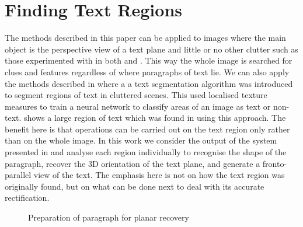 \section{Finding Text Regions}   \label{recoveryusinglines}

The methods described in this paper can be applied to images where the main
object is the perspective view of a text plane and little or no other clutter
such as those experimented with in both \cite{pilucvpr1} and \cite{dance02}.
This way the whole image is searched for clues and features regardless of where
paragraphs of text lie. We can also apply the methods described in
\cite{ClarkICPR2000,clark-ijdar-2001} where a  a text segmentation algorithm was 
introduced to segment regions of text in cluttered scenes. This used 
localised texture measures to train a neural network to classify areas of an
image as text or non-text.  shows a large region of text 
which was found in  using this approach. The benefit here is
that operations can be carried out on the text region only rather than on the
whole image.
In this work we consider the output of the system presented in
\cite{ClarkICPR2000,clark-ijdar-2001} and analyse each region individually to recognise the shape
of the paragraph, recover the 3D orientation of the text plane, and generate a
fronto-parallel view of the text. The emphasis here is not on how the text
region was originally found, but on what can be done next to deal with its
accurate rectification.

\begin{figure}[h]
\begin{centering}
  \hspace*{1mm}
  \hspace*{1mm}
\label{runprep}
\caption{Preparation of paragraph for planar recovery}
\end{centering}
\end{figure}

